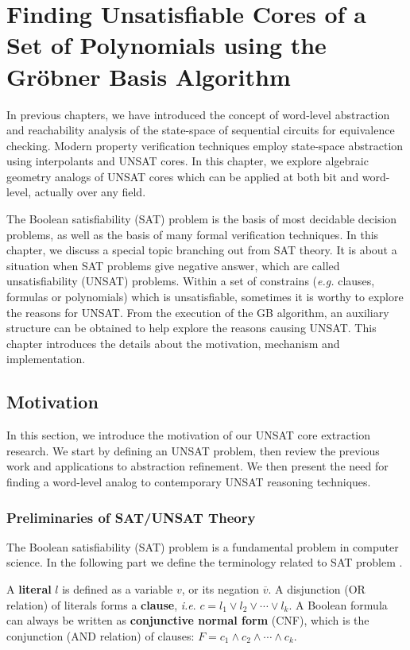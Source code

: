 \chapter{Finding Unsatisfiable Cores of a Set of Polynomials using the Gr\"obner Basis Algorithm}
\label{ch:UNSAT}
In previous chapters, we have introduced the concept of word-level abstraction and 
reachability analysis of the state-space of sequential circuits for equivalence checking.
Modern property verification techniques employ state-space abstraction using interpolants and UNSAT 
cores. In this chapter, we explore algebraic geometry analogs of UNSAT cores which can be 
applied at both bit and word-level, actually over any field.

The Boolean satisfiability (SAT) problem is the basis of 
most decidable decision problems, as well as the basis of many formal verification techniques. 
In this chapter, we discuss a special topic branching out from SAT theory. It is about a situation 
when SAT problems give negative answer, which are called unsatisfiability (UNSAT) problems. Within 
a set of constrains ({\it e.g.} clauses, formulas or polynomials) which is unsatisfiable, sometimes 
it is worthy to explore the reasons for UNSAT. From the execution of the GB algorithm, 
an auxiliary structure can be obtained to help explore the reasons causing UNSAT. This chapter introduces the 
details about the motivation, mechanism and implementation. 

\section{Motivation}
In this section, we introduce the motivation of our UNSAT core extraction research. We
start by defining an UNSAT problem, then review the previous work and applications 
to abstraction refinement. We then present the need for finding a word-level 
analog to contemporary UNSAT reasoning techniques.

\subsection{Preliminaries of SAT/UNSAT Theory}
The Boolean satisfiability (SAT) problem is a fundamental problem in computer science.
In the following part we define the terminology related to SAT problem \cite{anaICCAD}.

\begin{Definition}
A {\bf literal} $l$ is defined as a variable $v$, or its negation $\overline{v}$. A disjunction (OR relation)
of literals forms a {\bf clause}, {\it i.e}. $c = l_1\lor l_2 \lor \cdots \lor l_k$. 
A Boolean formula can always be written as {\bf conjunctive normal form} (CNF),
which is the conjunction (AND relation) of clauses: $F = c_1\land c_2\land\cdots\land c_k$.
\end{Definition}


